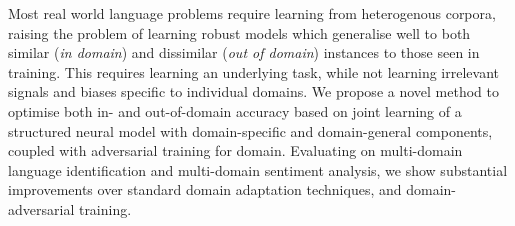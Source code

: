 Most real world language problems require learning from heterogenous corpora, raising the problem of learning robust models which generalise well to both similar (\emph{in domain}) and dissimilar (\emph{out of domain}) instances to those seen in training. This requires learning an underlying task, while not learning irrelevant signals and biases specific to individual domains. We propose a novel method to optimise both in- and out-of-domain accuracy based on joint learning of a structured neural model with domain-specific and domain-general components, coupled with adversarial training for domain. Evaluating on multi-domain language identification and multi-domain sentiment analysis, we show substantial improvements over standard domain adaptation techniques, and domain-adversarial training.
